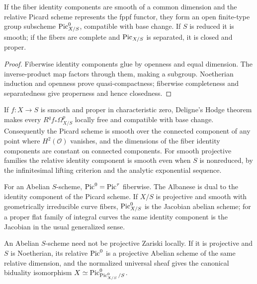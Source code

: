 \begin{proposition}\label{kps-prop-relative-pic0}
If the fiber identity components are smooth of a common dimension and the
relative Picard scheme represents the fppf functor, they form an open finite-type
group subscheme $\operatorname{Pic}^0_{X/S}$, compatible with base change. If $S$ is reduced it
is smooth; if the fibers are complete and $\operatorname{Pic}_{X/S}$ is separated, it is
closed and proper.
\end{proposition}
\begin{proof}
Fiberwise identity components glue by openness and equal dimension. The
inverse-product map factors through them, making a subgroup. Noetherian
induction and openness prove quasi-compactness; fiberwise completeness and
separatedness give properness and hence closedness.
\end{proof}

\begin{remark}\label{kps-rmk-relative-charzero}
If $f:X\to S$ is smooth and proper in characteristic zero, Deligne's Hodge
theorem makes every $R^qf_*\Omega^p_{X/S}$ locally free and compatible with
base change. Consequently the Picard scheme is smooth over the connected
component of any point where $H^2(\mathcal O)$ vanishes, and the dimensions
of the fiber identity components are constant on connected components. For
smooth projective families the relative identity component is smooth even
when $S$ is nonreduced, by the infinitesimal lifting criterion and the
analytic exponential sequence.
\end{remark}

\begin{remark}\label{kps-rmk-jacobian}
For an Abelian $S$-scheme, $\operatorname{Pic}^0=\operatorname{Pic}^\tau$ fiberwise. The Albanese is dual to
the identity component of the Picard scheme. If $X/S$ is projective and smooth
with geometrically irreducible curve fibers, $\operatorname{Pic}^0_{X/S}$ is the Jacobian
abelian scheme; for a proper flat family of integral curves the same identity
component is the Jacobian in the usual generalized sense.
\end{remark}

\begin{remark}\label{kps-rmk-abelian-duality}
An Abelian $S$-scheme need not be projective Zariski locally. If it is projective
and $S$ is Noetherian, its relative $\operatorname{Pic}^0$ is a projective Abelian scheme of
the same relative dimension, and the normalized universal sheaf gives the
canonical biduality isomorphism $X\simeq\operatorname{Pic}^0_{\operatorname{Pic}^0_{X/S}/S}$.
\end{remark}

